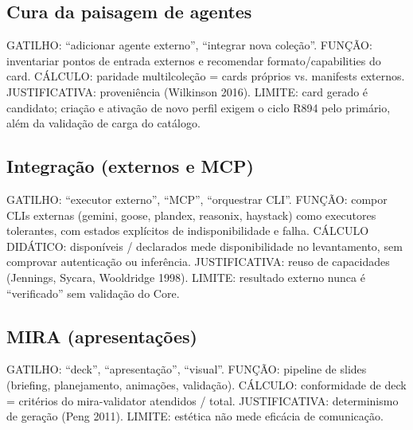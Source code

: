 \subsection{Cura da paisagem de agentes}

\begin{descricao}
GATILHO: ``adicionar agente externo'', ``integrar nova coleção''. FUNÇÃO:
inventariar pontos de entrada externos e recomendar formato/capabilities do
card. CÁLCULO: paridade multilcoleção = cards próprios vs. manifests externos.
JUSTIFICATIVA: proveniência (Wilkinson 2016). LIMITE: card gerado é
candidato; criação e ativação de novo perfil exigem o ciclo R894 pelo primário,
além da validação de carga do catálogo.
\end{descricao}

\subsection{Integração (externos e MCP)}

\begin{descricao}
GATILHO: ``executor externo'', ``MCP'', ``orquestrar CLI''. FUNÇÃO: compor
CLIs externas (gemini, goose, plandex, reasonix, haystack) como executores
tolerantes, com estados explícitos de indisponibilidade e falha. CÁLCULO
DIDÁTICO: disponíveis / declarados mede disponibilidade no levantamento,
sem comprovar autenticação ou inferência. JUSTIFICATIVA: reuso de
capacidades (Jennings, Sycara, Wooldridge 1998). LIMITE: resultado externo
nunca é ``verificado'' sem validação do Core.
\end{descricao}

\subsection{MIRA (apresentações)}

\begin{descricao}
GATILHO: ``deck'', ``apresentação'', ``visual''. FUNÇÃO: pipeline de slides
(briefing, planejamento, animações, validação). CÁLCULO: conformidade de
deck = critérios do mira-validator atendidos / total. JUSTIFICATIVA:
determinismo de geração (Peng 2011). LIMITE: estética não mede eficácia de
comunicação.
\end{descricao}

